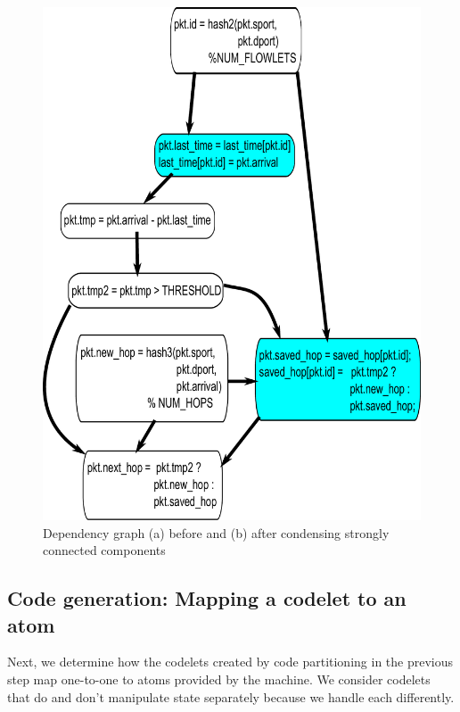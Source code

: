 \begin{figure}[!t]
\begin{minipage}{0.5\textwidth}
\includegraphics[width=\columnwidth]{scc.pdf}
\end{minipage}
\caption{Dependency graph (a) before and (b) after condensing strongly connected components}
\label{fig:partitioning}
\end{figure}

\subsection{Code generation: Mapping a codelet to an atom}
\label{ss:code_gen}
Next, we determine how the codelets created by code partitioning in the
previous step map one-to-one to atoms provided by the \absmachine machine. We
consider codelets that do and don't manipulate state separately because we
handle each differently.

